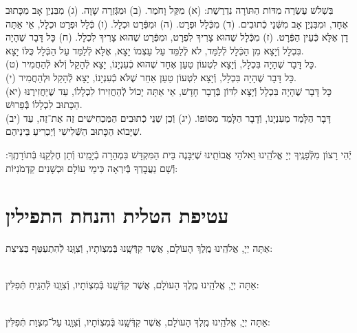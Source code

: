 \documentclass[twoside, openany, parskip=half, 11pt]{book}
\begin{document}
בִּשְׁלֹשׁ עֶשְׂרֵה מִדּוֹת הַתּוֹרָה נִדְרֶשֶׁת:\hfill \break
(א) מִקַּל וָחֹמֶר.\hfill \break
(ב) וּמִגְּֿזֵרָה שָׁוָה.\hfill \break
(ג) מִבִּנְיַן אָב מִכָּתוּב אֶחָד, וּמִבִּנְיַן אָב מִשְּֿׁנֵי כְֿתוּבִים.\hfill \break
(ד) מִכְּֿלָל וּפְרָט.\hfill \break
(ה) וּמִפְּֿרָט וּכְלָל.\hfill \break
(ו) כְּֿלָל וּפְרָט וּכְלָל, אֵי אַתָּה דָן אֶלָּא כְּֿעֵין הַפְּֿרָט.\hfill \break
(ז) מִכְּֿלָל שֶׁהוּא צָרִיךְ לִפְרָט, וּמִפְּֿרָט שֶׁהוּא צָרִיךְ לִכְלָל.\hfill \break
(ח) כָּל דָּבָר שֶׁהָיָה בִּכְלָל וְֿיָצָא מִן הַכְּֿלָל לְֿלַמֵּד, לֹא לְֿלַמֵּד עַל עַצְמוֹ יָצָא, אֶלָּא לְֿלַמֵּד עַל הַכְּֿלָל כֻּלּוֹ יָצָא. \\
(ט) כָּל דָּבָר שֶׁהָיָה בִּכְלָל, וְֿיָצָא לִטְעוֹן טַעַן אֶחָד שֶׁהוּא כְֿעִנְיָנוֹ, יָצָא לְֿהָקֵל וְֿלֹא לְֿהַחֲמִיר. \\
(י) כָּל דָּבָר שֶׁהָיָה בִּכְלָל, וְֿיָצָא לִטְעוֹן טַעַן אַחֵר שֶׁלֹּא כְֿעִנְיָנוֹ, יָצָא לְֿהָקֵל וּלְהַחֲמִיר. \\
(יא) כָּל דָּבָר שֶׁהָיָה בִּכְלָל וְֿיָצָא לִדּוֹן בְּֿדָבָר חָדָשׁ, אֵי אַתָּה יָכוֹל לְֿהַחֲזִירוֹ לִכְלָלוֹ, עַד שֶׁיַּחֲזִירֶנּוּ הַכָּתוּב לִכְלָלוֹ בְּֿפֵרוּשׁ. \\
(יב) דָּבָר הַלָּמֵד מֵעִנְיָנוֹ, וְֿדָבָר הַלָּמֵד מִסּוֹפוֹ.\hfill \break
(יג) וְֿכֵן שְׁנֵי כְֿתוּבִים הַמַּכְחִישִׁים זֶה אֶת־זֶה, עַד שֶׁיָּבוֹא הַכָּתוּב הַשְּֿׁלִישִׁי וְֿיַכְרִיעַ בֵּינֵיהֶם.

יְֿהִי רָצוֹן מִלְּֿפָנֶֽיךָ יְיָ אֱלֹהֵֽינוּ וֵאלֹהֵי אֲבוֹתֵֽינוּ שֶׁיִּבָּנֶה בֵּית הַמִּקְדָּשׁ בִּמְהֵרָה בְֿיָמֵֽינוּ וְֿתֵן חֶלְקֵֽנוּ בְּֿתוֹרָתֶֽךָ: וְֿשָׁם נַעֲבׇדְךָ בְּֿיִרְאָה כִּימֵי עוֹלָם וּכְשָׁנִים קַדְמֹנִיּוֹת:

\clearpage

\section[עטיפת הטלית והנחת התפילין]{ עטיפת הטלית והנחת התפילין }

אַתָּה יְיָ, אֱלֹהֵֽינוּ מֶֽלֶךְ הָעוֹלָם, אֲשֶׁר קִדְּֿשָֽׁנוּ בְּֿמִצְוֹתָיו, וְֿצִוָּֽנוּ לְֿהִתְעַטֵּף בַּצִּיצִת:


\sepline

\\
אַתָּה יְיָ, אֱלֹהֵֽינוּ מֶֽלֶךְ הָעוֺלָם, אֲשֶׁר קִדְּֿשָֽׁנוּ בְּֿמִצְוֹתָיו, וְֿצִוָֽנוּ לְֿהַנִּֽיחַ תְּֿפִלִּין:

\\
אַתָּה יְיָ, אֱלֹהֵֽינוּ מֶֽלֶךְ הָעוֺלָם, אֲשֶׁר קִדְּֿשָֽׁנוּ בְּֿמִצְוֹתָיו, וְֿצִוָֽנוּ עַל־מִצְוַת תְּֿפִלִּין:
\end{document}
